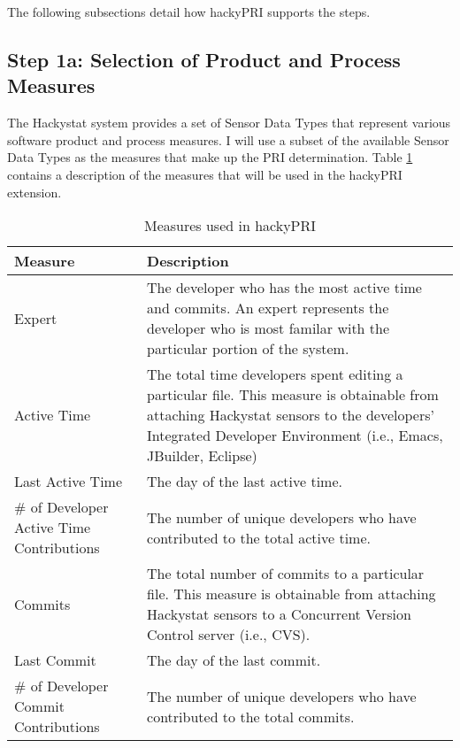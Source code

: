 The following subsections detail how hackyPRI supports the steps.

\subsection{Step 1a: Selection of Product and Process Measures}
The Hackystat system provides a set of Sensor Data Types that represent
various software product and process measures. I will use a subset of the
available Sensor Data Types as the measures that make up the PRI
determination. Table \ref{table:measures-hackyPRI} contains a description
of the measures that will be used in the hackyPRI extension.

\begin{table}[htbp]
  \begin{center}
    \caption{Measures used in hackyPRI}
    \label{table:measures-hackyPRI}
    \begin{tabular}{|p{3.0cm}|p{10.0cm}|} \hline
      {\bf Measure} & {\bf Description} \\ \hline
\small{}Expert & \small{}The developer who has the most active time and
commits. An expert represents the developer who is most familar with the
particular portion of the system. \\ \hline

\small{}Active Time & \small{}The total time developers spent editing a
particular file. This measure is obtainable from attaching Hackystat
sensors to the developers' Integrated Developer Environment (i.e., Emacs,
JBuilder, Eclipse) \\ \hline
\small{}Last Active Time & \small{}The day of the last active time. \\ \hline
\small{}\# of Developer \newline Active Time \newline Contributions &
\small{}The number of unique developers who have contributed to the total
active time. \\ \hline

\small{}Commits & \small{}The total number of commits to a particular
file. This measure is obtainable from attaching Hackystat sensors to a
Concurrent Version Control server (i.e., CVS). \\ \hline
\small{}Last Commit & \small{}The day of the last commit. \\ \hline
\small{}\# of Developer \newline Commit \newline Contributions &
\small{}The number of unique developers who have contributed to the total
commits. \\ \hline


\end{tabular}
\end{center}
\end{table}
